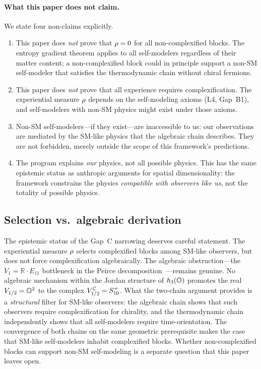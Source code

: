 \paragraph{What this paper does not claim.}
We state four non-claims explicitly.
\begin{enumerate}
  \item This paper does \emph{not} prove that $\rho = 0$ for all
    non-complexified blocks.  The entropy gradient theorem applies to
    all self-modelers regardless of their matter content; a
    non-complexified block could in principle support a non-SM
    self-modeler that satisfies the thermodynamic chain without chiral
    fermions.
  \item This paper does \emph{not} prove that all experience requires
    complexification.  The experiential measure $\rho$ depends on
    the self-modeling axioms (L4, Gap~B1), and self-modelers with
    non-SM physics might exist under those axioms.
  \item Non-SM self-modelers---if they exist---are inaccessible to us:
    our observations are mediated by the SM-like physics that the
    algebraic chain describes.  They are not forbidden, merely outside
    the scope of this framework's predictions.
  \item The program explains \emph{our} physics, not all possible
    physics.  This has the same epistemic status as anthropic arguments
    for spatial dimensionality: the framework constrains the physics
    \emph{compatible with observers like us}, not the totality of
    possible physics.
\end{enumerate}

\subsection{Selection vs.\ algebraic derivation}
\label{sec:selection-vs-algebra}

The epistemic status of the Gap~C narrowing deserves careful
statement.  The experiential measure $\rho$ selects complexified
blocks among SM-like observers, but does not force complexification
algebraically.  The algebraic obstruction---the $V_1 =
\mathbb{R}\cdot E_{11}$ bottleneck in the Peirce
decomposition~\cite{BGW2020}---remains genuine.  No algebraic
mechanism within the Jordan structure of $h_3(\mathbb{O})$ promotes the real
$V_{1/2} = \mathbb{O}^2$ to the complex $V_{1/2}^{\mathbb{C}} =
S_{10}^+$.  What the two-chain argument provides is a
\emph{structural} filter for SM-like observers: the algebraic chain
shows that such observers require complexification for chirality, and
the thermodynamic chain independently shows that all self-modelers
require time-orientation.  The convergence of both chains on the same
geometric prerequisite makes the case that SM-like self-modelers
inhabit complexified blocks.  Whether non-complexified blocks can
support non-SM self-modeling is a separate question that this paper
leaves open.


